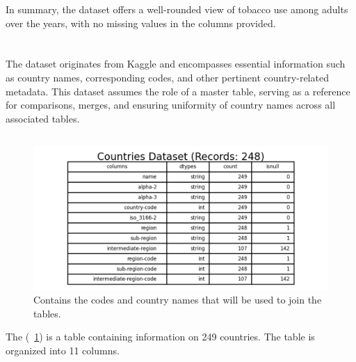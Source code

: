                 In summary, the dataset offers a well-rounded view of tobacco use among adults over the years, with no missing values in the columns provided.


    \section{\dsCountries}

        \subsection{\duCollectInitialData}
            The dataset originates from Kaggle and encompasses essential information such as country names, corresponding
            codes, and other pertinent country-related metadata. This dataset assumes the role of a master table, serving
            as a reference for comparisons, merges, and ensuring uniformity of country names across all associated tables.

        \subsection{\duDescribeTheData}
            \begin{figure}[H]
                \centering
                \includegraphics[scale=1.3]{images/du_country_dataset}
                \caption{Contains the codes and country names that will be used to join the tables.}
                \label{fig:du-countries-datasets}
            \end{figure}

            The \textit{\dsCountries} (\figurename~\ref{fig:du-countries-datasets}) is a table containing information on 249 countries. The table is organized into 11 columns.

